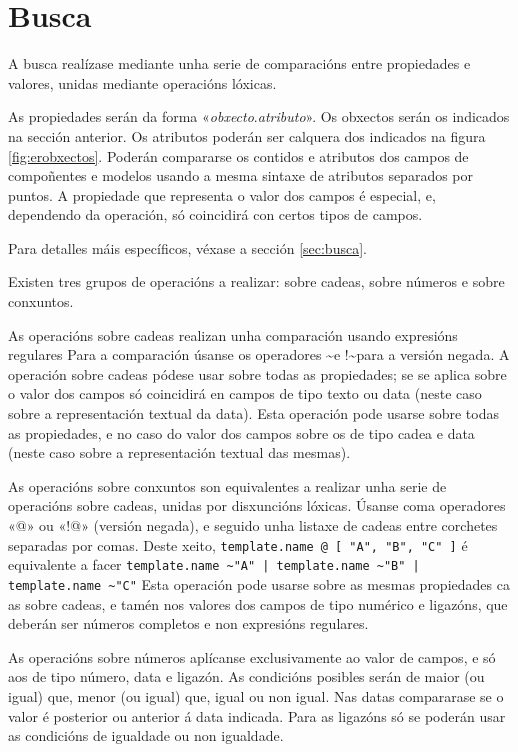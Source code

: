 \section{Busca}

A busca realízase mediante unha serie de comparacións entre propiedades e valores, unidas mediante operacións lóxicas.

As propiedades serán da forma «\textit{obxecto}.\textit{atributo}». Os obxectos serán os indicados na sección anterior. Os atributos poderán ser calquera dos indicados na figura \ref{fig:erobxectos}. Poderán compararse os contidos e atributos dos campos de compoñentes e modelos usando a mesma sintaxe de atributos separados por puntos. A propiedade que representa o valor dos campos é especial, e, dependendo da operación, só coincidirá con certos tipos de campos.

Para detalles máis específicos, véxase a sección \ref{sec:busca}.

Existen tres grupos de operacións a realizar: sobre cadeas, sobre números e sobre conxuntos.

As operacións sobre cadeas realizan unha comparación usando expresións regulares Para a comparación úsanse os operadores \textasciitilde e !\textasciitilde para a versión negada. A operación sobre cadeas pódese usar sobre todas as propiedades; se se aplica sobre o valor dos campos só coincidirá en campos de tipo texto ou data (neste caso sobre a representación textual da data). Esta operación pode usarse sobre todas as propiedades, e no caso do valor dos campos sobre os de tipo cadea e data (neste caso sobre a representación textual das mesmas).

As operacións sobre conxuntos son equivalentes a realizar unha serie de operacións sobre cadeas, unidas por disxuncións lóxicas. Úsanse coma operadores «@» ou «!@» (versión negada), e seguido unha listaxe de cadeas entre corchetes separadas por comas. Deste xeito, \texttt{template.name @ [ "A", "B", "C" ]} é equivalente a facer \texttt{template.name \textasciitilde "A" | template.name \textasciitilde "B" | template.name \textasciitilde "C"} Esta operación pode usarse sobre as mesmas propiedades ca as sobre cadeas, e tamén nos valores dos campos de tipo numérico e ligazóns, que deberán ser números completos e non expresións regulares.

As operacións sobre números aplícanse exclusivamente ao valor de campos, e só aos de tipo número, data e ligazón. As condicións posibles serán de maior (ou igual) que, menor (ou igual) que, igual ou non igual. Nas datas compararase se o valor é posterior ou anterior á data indicada. Para as ligazóns só se poderán usar as condicións de igualdade ou non igualdade.

